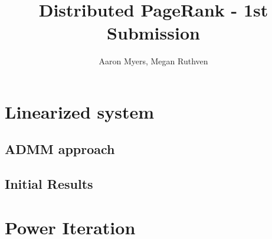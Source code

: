 \documentclass[a4paper,10pt]{article}
\title{Distributed PageRank - 1st Submission}
\author{Aaron Myers, Megan Ruthven}
\begin{document}
\maketitle
\section{Linearized system}

\subsection{ADMM approach}

\subsection{Initial Results}

\section{Power Iteration}
\end{document}
